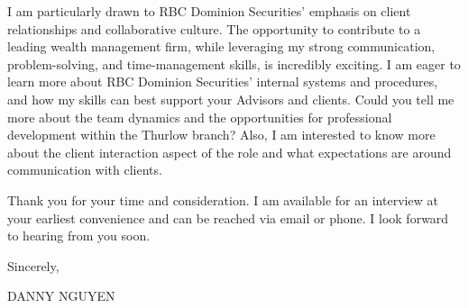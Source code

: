 \documentclass[letterpaper,11pt]{article}
\begin{document}
I am particularly drawn to RBC Dominion Securities' emphasis on client relationships and collaborative culture.  The opportunity to contribute to a leading wealth management firm, while leveraging my strong communication, problem-solving, and time-management skills, is incredibly exciting. I am eager to learn more about RBC Dominion Securities’ internal systems and procedures, and how my skills can best support your Advisors and clients.  Could you tell me more about the team dynamics and the opportunities for professional development within the Thurlow branch?  Also, I am interested to know more about the client interaction aspect of the role and what expectations are around communication with clients.

\vspace{10pt}

Thank you for your time and consideration. I am available for an interview at your earliest convenience and can be reached via email or phone.  I look forward to hearing from you soon.

\vspace{20pt}

Sincerely, \\
\vspace{40pt}

DANNY NGUYEN
\end{document}
